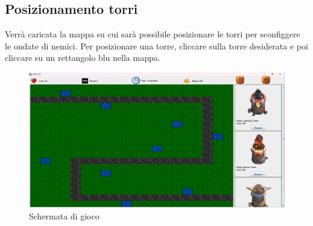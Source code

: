 \documentclass[a4paper,12pt]{report}
\begin{document}
\subsection{Posizionamento torri}
Verrà caricata la mappa su cui sarà possibile posizionare le torri per sconfiggere le ondate di nemici. Per posizionare una torre, cliccare sulla torre desiderata e poi cliccare su un rettangolo blu nella mappa.
\begin{figure}[H]
    \centering
    \includegraphics[scale=1.2]{PosizionamentoTorri}
    \caption{Schermata di gioco}
    \label{fig:gamePlay}
\end{figure}
\end{document}
